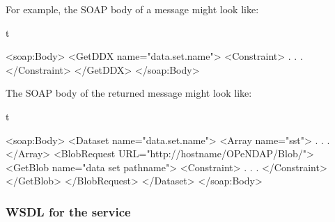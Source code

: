 \documentclass[justify]{dods-paper}
\begin{document}
For example, the SOAP body of a \GetDDX message might look like:

\begin{vcode}{t}

    <soap:Body>
        <GetDDX name="data.set.name">
            <Constraint>
                .
                .
                .
            </Constraint>
        </GetDDX>
    </soap:Body>
    
\end{vcode}

The SOAP body of the returned message might look like:

\begin{vcode}{t}

    <soap:Body>
        <Dataset name="data.set.name">
            <Array name="sst">
                .
                .
                .
            </Array>
            <BlobRequest URL="http://hostname/OPeNDAP/Blob/">
                <GetBlob name="data set pathname">
                    <Constraint>
                       .
                       .
                       .
                    </Constraint>
                </GetBlob>
            </BlobRequest>
        </Dataset>
    </soap:Body>
    
\end{vcode}

\subsubsection{WSDL for the \GetDDX service}
\end{document}
